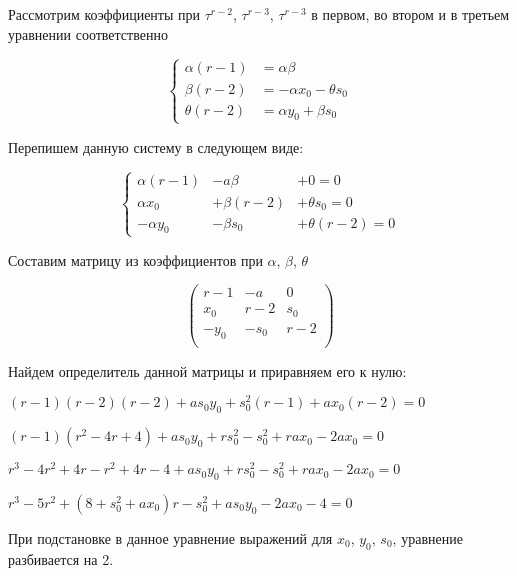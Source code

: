 Рассмотрим коэффициенты при $ \tau^{r-2} $, $ \tau^{r-3} $, $ \tau^{r-3} $ в первом, во втором и в третьем уравнении соответственно

\begin{equation}
\label{eq:step2_coeff}
	\left\{
		\begin{aligned}
			\alpha (r-1) &= \alpha \beta \\
			\beta  (r-2) &= -\alpha x_0 - \theta s_0 \\
			\theta (r-2) &= \alpha y_0 + \beta s_0
		\end{aligned}
	\right.
\end{equation}

Перепишем данную систему в следующем виде:

\begin{equation}
\label{eq:step2_coeff_determinant}
	\left\{
		\begin{aligned}
			\alpha (r-1) &- a \beta &+ 0 = 0 \\
			\alpha x_0   &+ \beta (r-2) &+ \theta s_0 = 0 \\
			-\alpha y_0	 &- \beta s_0 &+ \theta (r-2) = 0 
		\end{aligned}
	\right.
\end{equation}

Составим матрицу из коэффициентов при $ \alpha $, $ \beta $, $ \theta $ 

\begin{equation}
\label{eq:determinant}
	\left(
		\begin{array}{ccc}
			r-1 & -a & 0 \\
			x_0 & r-2 & s_0 \\
			-y_0 & -s_0 & r-2 \\
		\end{array}
	\right)
\end{equation}

Найдем определитель данной матрицы и приравняем его к нулю:

$ (r-1)(r-2)(r-2) + as_0y_0 + s^2_0(r-1) + ax_0(r-2) = 0 $

$ (r-1)(r^2-4r+4) + as_0y_0 + rs^2_0 - s^2_0 + rax_0 - 2ax_0 = 0 $

$ r^3 - 4r^2 + 4r - r^2 + 4r - 4 + as_0y_0 + rs^2_0 - s^2_0 + rax_0 - 2ax_0 = 0 $

$ r^3 - 5r^2 + (8 + s^2_0 + ax_0)r - s^2_0 + as_0y_0 - 2ax_0 - 4 = 0 $

При подстановке в данное уравнение выражений для $ x_0 $, $ y_0 $, $ s_0 $, уравнение разбивается на 2.


